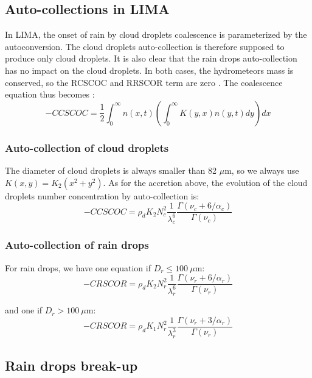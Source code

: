 \subsection{Auto-collections in LIMA}

In LIMA, the onset of rain by cloud droplets coalescence is parameterized by the autoconversion. The cloud droplets auto-collection is therefore supposed to produce only cloud droplets. It is also clear that the rain drops auto-collection has no impact on the cloud droplets. In both cases, the hydrometeors mass is conserved, so the RCSCOC and RRSCOR term are zero \citep[see the demonstration in appendix A of][]{Cohard2000c2r2}. The coalescence equation thus becomes \citep[appendix A of][]{Cohard2000c2r2}:
\begin{equation}
 -CCSCOC = \frac{1}{2} \int_0^\infty n(x,t) \left( \int_0^\infty K(y,x) n(y,t) dy \right) dx
\end{equation}

\subsubsection{Auto-collection of cloud droplets}

The diameter of cloud droplets is always smaller than 82 $\mu$m, so we always use $K(x,y) = K_2 (x^2 + y^2)$. As for the accretion above, the evolution of the cloud droplets number concentration by auto-collection is:
\begin{equation}
 -CCSCOC = \rho_d K_2 N_c^2 \frac{1}{\lambda_c^6} \frac{\Gamma(\nu_c+6/\alpha_c)}{\Gamma(\nu_c)}
\end{equation}

\subsubsection{Auto-collection of rain drops}

For rain drops, we have one equation if $D_r \leq 100~\mu$m:
\begin{equation}
 -CRSCOR = \rho_d K_2 N_r^2 \frac{1}{\lambda_r^6} \frac{\Gamma(\nu_r+6/\alpha_r)}{\Gamma(\nu_r)}
\end{equation}

and one if $D_r > 100~\mu$m:
\begin{equation}
 -CRSCOR = \rho_d K_1 N_r^2 \frac{1}{\lambda_r^3} \frac{\Gamma(\nu_r+3/\alpha_r)}{\Gamma(\nu_r)}
\end{equation}

\subsection{Rain drops break-up}

